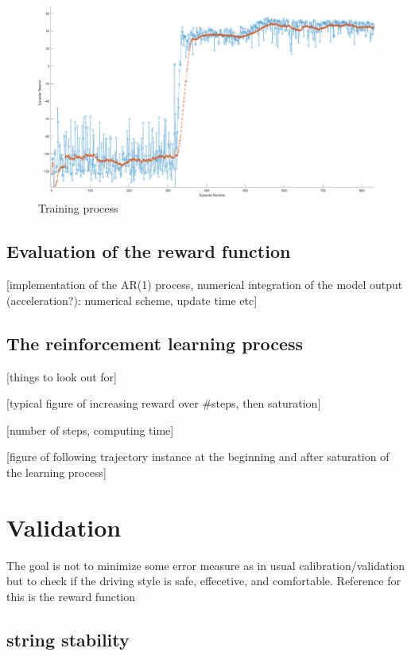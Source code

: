 \documentclass[review]{elsarticle}
\begin{document}
\begin{figure}
	\centering
	\includegraphics[width=12cm]{images/Training}
	\caption{Training process}
	\label{fig:training}
\end{figure}

\subsection{Evaluation of the reward function}

[implementation of the AR(1) process, numerical integration of the
  model output (acceleration?): numerical scheme, update time etc]

\subsection{The reinforcement learning process}

[things to look out for]

[typical figure of increasing reward over \#steps, then saturation]

[number of steps, computing time]

[figure of following trajectory instance at the beginning and after
  saturation of the 
  learning process]


\section{Validation}

The goal is not to minimize some error measure as in usual
calibration/validation but to check if the driving style is safe,
effecetive, and comfortable. Reference for this is the reward function

\subsection{string stability}
\end{document}
